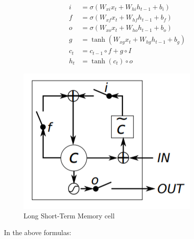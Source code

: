 \begin{align}
i &= \sigma ( W_{xi}x_{t} + W _{hi}h _{t-1} + b _{i}) \\
f &= \sigma(W_{xf}x_{t} + W_{hf}h_{t-1} + b_{f}) \\
o &= \sigma(W_{xo}x_{t} + W_{ho}h_{t-1} + b_{o})	\\
g &= \tanh (W_{xg}x_{t} + W_{hg}h_{t-1} + b_{g})	\\
c_{t} &= c_{t-1} \circ f+ g \circ I	\\
h_{t} &= \tanh(c_{t}) \circ o
\end{align}
\begin{center}
  \begin{figure}[H]
  \centering
  \includegraphics[width=0.5\columnwidth]{images/chap2/LSTM.png}
  \caption{Long Short-Term Memory cell \cite{DBLP:journals/corr/DonahueHGRVSD14}}
  \label{chap2:WSP}
  \end{figure}
\end{center}
In the above formulas:

